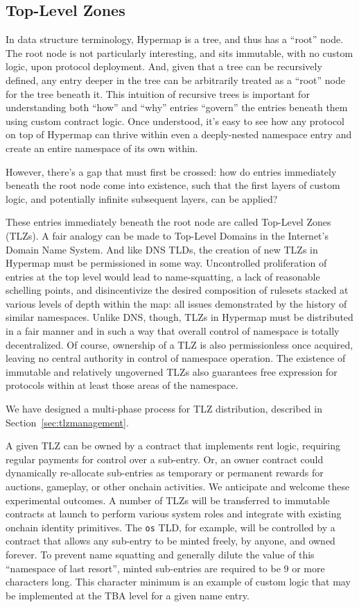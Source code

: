 \documentclass[runningheads]{llncs}
\begin{document}
\subsection{Top-Level Zones}
\label{sec:tlz}

In data structure terminology, Hypermap is a tree, and thus has a ``root'' node.
The root node is not particularly interesting, and sits immutable, with no custom logic, upon protocol deployment.
And, given that a tree can be recursively defined, any entry deeper in the tree can be arbitrarily treated as a ``root'' node for the tree beneath it.
This intuition of recursive trees is important for understanding both ``how'' and ``why'' entries ``govern'' the entries beneath them using custom contract logic.
Once understood, it's easy to see how any protocol on top of Hypermap can thrive within even a deeply-nested namespace entry and create an entire namespace of its own within.

However, there's a gap that must first be crossed: how do entries immediately beneath the root node come into existence, such that the first layers of custom logic, and potentially infinite subsequent layers, can be applied?

These entries immediately beneath the root node are called Top-Level Zones (TLZs).
A fair analogy can be made to Top-Level Domains in the Internet's Domain Name System.
And like DNS TLDs, the creation of new TLZs in Hypermap must be permissioned in some way.
Uncontrolled proliferation of entries at the top level would lead to name-squatting, a lack of reasonable schelling points, and disincentivize the desired composition of rulesets stacked at various levels of depth within the map: all issues demonstrated by the history of similar namespaces.
Unlike DNS, though, TLZs in Hypermap must be distributed in a fair manner and in such a way that overall control of namespace is totally decentralized.
Of course, ownership of a TLZ is also permissionless once acquired, leaving no central authority in control of namespace operation.
The existence of immutable and relatively ungoverned TLZs also guarantees free expression for protocols within at least those areas of the namespace.

We have designed a multi-phase process for TLZ distribution, described in Section~\ref{sec:tlzmanagement}.

A given TLZ can be owned by a contract that implements rent logic, requiring regular payments for control over a sub-entry.
Or, an owner contract could dynamically re-allocate sub-entries as temporary or permanent rewards for auctions, gameplay, or other onchain activities.
We anticipate and welcome these experimental outcomes.
A number of TLZs will be transferred to immutable contracts at launch to perform various system roles and integrate with existing onchain identity primitives.
The \verb|os| TLD, for example, will be controlled by a contract that allows any sub-entry to be minted freely, by anyone, and owned forever.
To prevent name squatting and generally dilute the value of this ``namespace of last resort'', minted sub-entries are required to be 9 or more characters long.
This character minimum is an example of custom logic that may be implemented at the TBA level for a given name entry.
\end{document}
